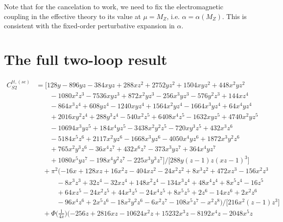 \documentclass[letter,11pt,DIV=12,abstract=true,numbers=noenddot,titlepage=false,twocolumn=false,draft=false]{scrartcl}
\begin{document}
Note that for the cancelation to work, we need to fix the
electromagnetic coupling in the effective theory to its value at
$\mu=M_Z$, i.e. $\alpha = \alpha(M_Z)$. This is consistent with the
fixed-order perturbative expansion in $\alpha$.

\newpage

\section{The full two-loop result}\label{sec:full}

\begin{equation}
\begin{split}
C_{S2}^{tt,(se)} & = \big[128 y - 896 y z - 384 x y z + 288 x z^2 + 2752 y z^2 + 1504 x y z^2 + 448 x^2 y z^2 \\
      & \qquad - 1080 x^2 z^3 - 7536 x y z^3 + 872 x^2 y z^3 - 256 x^3 y z^3 - 576 y^2 z^3 + 144 x z^4 \\
      & \qquad - 864 x^3 z^4 + 608 y z^4 - 1240 x y z^4 + 1564 x^2 y z^4 - 1664 x^3 y z^4 + 64 x^4 y z^4 \\
      & \qquad + 2016 x y^2 z^4 + 288 y^3 z^4 - 540 x^2 z^5 + 6408 x^4 z^5 - 1632 x y z^5 + 4740 x^2 y z^5 \\
      & \qquad - 10694 x^3 y z^5 + 184 x^4 y z^5 - 3438 x^2 y^2 z^5 - 720 x y^3 z^5 + 432 x^3 z^6 \\
      & \qquad - 5184 x^5 z^6 + 2117 x^2 y z^6 - 1668 x^3 y z^6 - 4050 x^4 y z^6 + 1872 x^3 y^2 z^6 \\
      & \qquad + 765 x^2 y^3 z^6 - 36 x^4 z^7 + 432 x^6 z^7 - 373 x^3 y z^7 + 364 x^4 y z^7 \\
      & \qquad + 1080 x^5 y z^7 - 198 x^4 y^2 z^7 - 225 x^3 y^3 z^7\big]/\big[288 y (z-1) z (x z-1)^3\big]\\
& \quad + \pi^2 (-16 x + 128 x z + 16 x^2 z - 404 x z^2 - 24 x^2 z^2 + 8 x^3 z^2 + 472 x z^3 - 156 x^2 z^3 \\
      & \qquad \quad - 8 x^3 z^3 + 32 z^4 - 32 x z^4 + 148 x^2 z^4 - 134 x^3 z^4 + 48 x^4 z^4 + 8 x^5 z^4 - 16 z^5 \\
      & \qquad \quad + 64 x z^5 - 24 x^2 z^5 + 44 x^3 z^5 - 24 x^4 z^5 + 8 x^5 z^5 + 2 z^6 - 14 x z^6 + 2 x^2 z^6 \\
      & \qquad \quad - 96 x^4 z^6 + 2 x^5 z^6 - 18 x^2 y^2 z^6 - 6 x^2 z^7 - 108 x^5 z^7 - x^2 z^8)/\big[216 x^2 (z-1) z^3 \big]\\
& \quad + \Phi\bigg(\frac{1}{4x}\bigg) (-256 z + 2816 x z - 10624 x^2 z + 15232 x^3 z - 8192 x^4 z - 2048 x^5 z\\

\end{split}
\end{equation}
\end{document}
